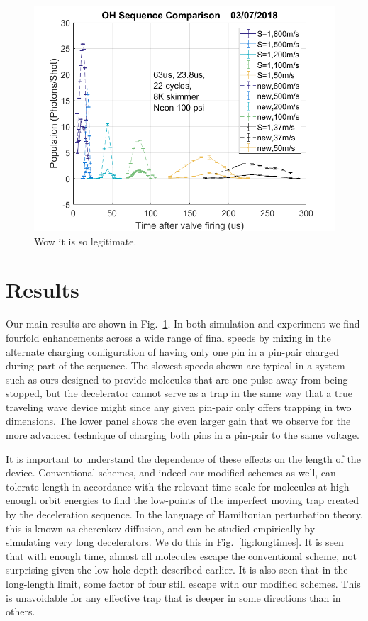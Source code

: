 \documentclass[%
 reprint,
 amsmath,amssymb,
 aps,
pra,
]{revtex4-1}
\begin{document}
\begin{figure}[t]
\includegraphics[width=\linewidth]{speedvary.png}%
\caption{
Wow it is so legitimate.
}
\label{fig:speedvary}
\end{figure}


\section{Results}
Our main results are shown in Fig.~\ref{fig:speedvary}. In both simulation and experiment we find fourfold enhancements across a wide range of final speeds by mixing in the alternate charging configuration of having only one pin in a pin-pair charged during part of the sequence. The slowest speeds shown are typical in a system such as ours designed to provide molecules that are one pulse away from being stopped, but the decelerator cannot serve as a trap in the same way that a true traveling wave device might since any given pin-pair only offers trapping in two dimensions. The lower panel shows the even larger gain that we observe for the more advanced technique of charging both pins in a pin-pair to the same voltage.

It is important to understand the dependence of these effects on the length of the device. Conventional schemes, and indeed our modified schemes as well, can tolerate length in accordance with the relevant time-scale for molecules at high enough orbit energies to find the low-points of the imperfect moving trap created by the deceleration sequence. In the language of Hamiltonian perturbation theory, this is known as cherenkov diffusion, and can be studied empirically by simulating very long decelerators. We do this in Fig.~\ref{fig:longtimes}. It is seen that with enough time, almost all molecules escape the conventional scheme, not surprising given the low hole depth described earlier. It is also seen that in the long-length limit, some factor of four still escape with our modified schemes. This is unavoidable for any effective trap that is deeper in some directions than in others.
\end{document}
